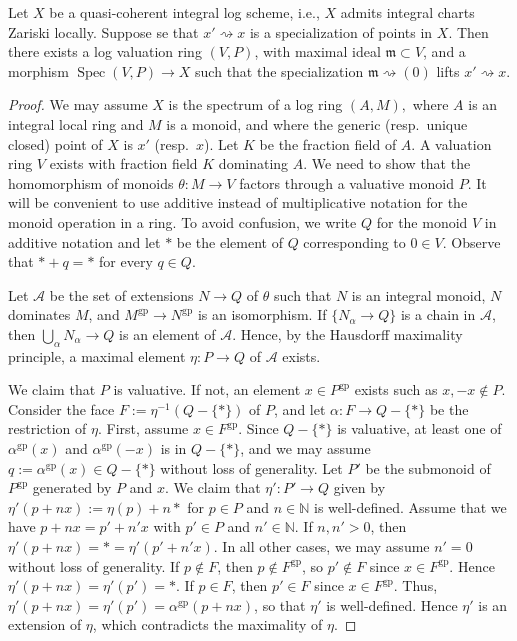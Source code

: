 \documentclass[10pt]{amsart}
\newcommand{\N}{\mathbb{N}}
\newcommand{\cA}{\mathcal{A}}
\newcommand{\gp}{\mathrm{gp}}
\DeclareMathOperator{\Spec}{Spec}
\begin{document}
\begin{theorem}\label{thm:logvaluationringsliftspecializations}
Let $X$ be a quasi-coherent integral log scheme, 
i.e., $X$ admits integral charts Zariski locally.
Suppose se that $x' \rightsquigarrow x$ is a specialization
of points in $X$. 
Then there exists a log valuation ring $(V,P)$, 
with maximal ideal $\mathfrak{m} \subset V$, 
and a morphism $\Spec{(V,P)} \to X$ such that the specialization
$\mathfrak{m} \rightsquigarrow (0)$ lifts $x' \rightsquigarrow x$.
\end{theorem}
\begin{proof}
We may assume $X$ is the spectrum of a log ring $(A,M),$ 
where $A$ is an integral local ring and $M$ is a monoid, 
and where the generic (resp.\ unique closed) point of $X$ is $x'$ (resp.\ $x$).
Let $K$ be the fraction field of $A$.
A valuation ring $V$ exists with fraction field $K$ dominating $A$.
We need to show that the homomorphism of monoids $\theta\colon M\to V$ 
factors through a valuative monoid $P$.
It will be convenient to use additive instead of multiplicative notation for the 
monoid operation in a ring.
To avoid confusion,
we write $Q$ for the monoid $V$ in additive notation
and let $*$ be the element of $Q$ corresponding to $0\in V$.
Observe that $*+q=*$ for every $q\in Q$.

Let $\cA$ be the set of extensions $N\to Q$ of $\theta$ such that $N$ is an integral monoid,
$N$ dominates $M$,
and $M^\gp\to N^\gp$ is an isomorphism.
If $\{N_\alpha\to Q\}$ is a chain in $\cA$,
then $\bigcup_\alpha N_\alpha \to Q$ is an element of $\cA$.
Hence, 
by the Hausdorff maximality principle, 
a maximal element $\eta\colon P\to Q$ of $\cA$ exists.

We claim that $P$ is valuative.
If not, an element $x\in P^\gp$ exists such as $x,-x\notin P$.
Consider the face $F:=\eta^{-1}(Q-\{*\})$ of $P$,
and let $\alpha\colon F\to Q-\{*\}$ be the restriction of $\eta$.
First, assume $x\in F^\gp$.
Since $Q-\{*\}$ is valuative,
at least one of $\alpha^\gp(x)$ and $\alpha^\gp(-x)$ is in $Q-\{*\}$,
and we may assume $q:=\alpha^\gp(x)\in Q-\{*\}$ without loss of generality.
Let $P'$ be the submonoid of $P^{\gp}$ generated by $P$ and $x$.
We claim that $\eta'\colon P'\to Q$ given by $\eta'(p+nx):=\eta(p)+n*$ for $p\in P$ and $n\in \N$ is well-defined.
Assume that we have $p+nx=p'+n'x$ with $p'\in P$ and $n'\in \N$.
If $n,n'>0$,
then $\eta'(p+nx)=*=\eta'(p'+n'x)$.
In all other cases, we may assume $n'=0$ without loss of generality.
If $p\notin F$, then $p\notin F^\gp$,
so $p'\notin F$ since $x\in F^\gp$.
Hence $\eta'(p+nx)=\eta'(p')=*$.
If $p\in F$,
then $p'\in F$ since $x\in F^\gp$.
Thus, 
$\eta'(p+nx)=\eta'(p')=\alpha^\gp(p+nx)$, 
so that $\eta'$ is well-defined.
Hence $\eta'$ is an extension of $\eta$,
which contradicts the maximality of $\eta$.


\end{proof}
\end{document}
